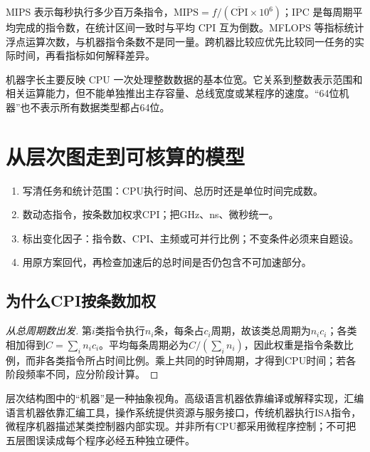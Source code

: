 MIPS 表示每秒执行多少百万条指令，\(\mathrm{MIPS}=f/(\overline{\mathrm{CPI}}\times10^6)\)；IPC 是每周期平均完成的指令数，在统计区间一致时与平均 CPI 互为倒数。MFLOPS 等指标统计浮点运算次数，与机器指令条数不是同一量。跨机器比较应优先比较同一任务的实际时间，再看指标如何解释差异。

机器字长主要反映 CPU 一次处理整数数据的基本位宽。它关系到整数表示范围和相关运算能力，但不能单独推出主存容量、总线宽度或某程序的速度。``64位机器''也不表示所有数据类型都占64位。

\section{从层次图走到可核算的模型}\label{CO01-model}

\begin{methodbox}[性能题四步]

\begin{enumerate}
\def\labelenumi{\arabic{enumi}.}
\tightlist
\item
  写清任务和统计范围：CPU执行时间、总历时还是单位时间完成数。
\item
  数动态指令，按条数加权求CPI；把GHz、ns、微秒统一。
\item
  标出变化因子：指令数、CPI、主频或可并行比例；不变条件必须来自题设。
\item
  用原方案回代，再检查加速后的总时间是否仍包含不可加速部分。
\end{enumerate}

\end{methodbox}

\subsection{为什么CPI按条数加权}\label{CO01-proof}

\begin{proof}[从总周期数出发]

第\(i\)类指令执行\(n_i\)条，每条占\(c_i\)周期，故该类总周期为\(n_ic_i\)；各类相加得到\(C=\sum_i n_ic_i\)。平均每条周期必为\(C/(\sum_i n_i)\)，因此权重是指令条数比例，而非各类指令所占时间比例。乘上共同的时钟周期，才得到CPU时间；若各阶段频率不同，应分阶段计算。

\end{proof}

层次结构图中的``机器''是一种抽象视角。高级语言机器依靠编译或解释实现，汇编语言机器依靠汇编工具，操作系统提供资源与服务接口，传统机器执行ISA指令，微程序机器描述某类控制器内部实现。并非所有CPU都采用微程序控制；不可把五层图误读成每个程序必经五种独立硬件。

